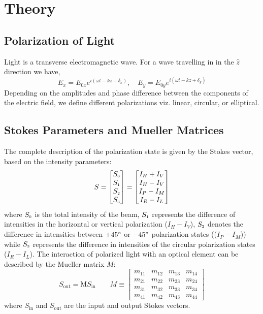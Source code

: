 \section{Theory}
\subsection{Polarization of Light}
Light is a transverse electromagnetic wave. For a wave travelling in in the $\hat{z}$ direction we have,
\begin{equation}
E_x = E_{0x} e^{i(\omega t - kz + \delta_x)}, \quad
E_y = E_{0y} e^{i(\omega t - kz + \delta_y)}
\end{equation}
Depending on the amplitudes and phase difference between the components of the electric field, we define different polarizations viz. linear, circular, or elliptical.

\subsection{Stokes Parameters and Mueller Matrices}
The complete description of the polarization state is given by the Stokes vector, based on the intensity parameters:
\begin{equation}\label{stokes}
S =
\begin{bmatrix}
S_{\text{\tiny 0}} \\
S_{\text{\tiny 1}} \\
S_{\text{\tiny 2}} \\
S_{\text{\tiny 3}}
\end{bmatrix}
=
\begin{bmatrix}
I_H + I_V \\
I_H - I_V \\
I_P - I_M \\
I_R - I_L
\end{bmatrix}
\end{equation}
where $S_{\text{\tiny 0}}$ is the total intensity of the beam,  $S_{\text{\tiny 1}}$ represents the difference of intensities in the horizontal or vertical polarization ($I_H - I_V$), $S_{\text{\tiny 2}}$ denotes the difference in intensities between  $+45\degree$ or $-45\degree$ polarization states (($I_P - I_M$)) while $S_{\text{\tiny 3}}$ represents the difference in intensities of the circular polarization states ($I_R - I_L$).
\noindent
The interaction of polarized light with an optical element can be described by the Mueller matrix $M$:
\begin{equation}
S_{\text{out}} = \mathrm{M} S_{\text{in}}\qquad M \equiv
\begin{bmatrix}
m_{11} & m_{12} & m_{13} & m_{14} \\
m_{21} & m_{22} & m_{23} & m_{24} \\
m_{31} & m_{32} & m_{33} & m_{34} \\
m_{41} & m_{42} & m_{43} & m_{44}
\end{bmatrix}
\end{equation}
where $S_{\text{in}}$ and $S_{\text{out}}$ are the input and output Stokes vectors.
